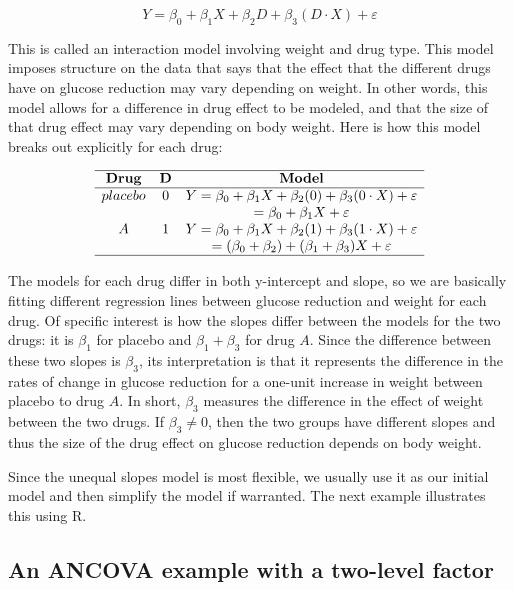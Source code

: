 \documentclass[
]{book}
\begin{document}
\[Y = \beta_0 + \beta_1 X + \beta_2 D + \beta_3(D\cdot X) + \varepsilon\]

This is called an interaction model involving weight and drug type. This model imposes structure on the data that says that the effect that the different drugs have on glucose reduction may vary depending on weight. In other words, this model allows for a difference in drug effect to be modeled, and that the size of that drug effect may vary depending on body weight. Here is how this model breaks out explicitly for each drug:

\[\begin{array}{ccc} 
\hline
\textbf{Drug} & \mathbf{D} & \textbf{Model} \\
\hline
placebo & 0 & Y = \beta_0 + \beta_1 X + \beta_2(0) + \beta_3(0\cdot X) + \varepsilon \\
& & = \beta_0 + \beta_1 X + \varepsilon \\
A       & 1 &   Y = \beta_0 + \beta_1 X + \beta_2(1) + \beta_3(1\cdot X) + \varepsilon \\
& & = (\beta_0 + \beta_2) + (\beta_1 + \beta_3) X + \varepsilon \\
\hline
\end{array}\]

The models for each drug differ in both y-intercept and slope, so we are basically fitting different regression lines between glucose reduction and weight for each drug. Of specific interest is how the slopes differ between the models for the two drugs: it is \(\beta_1\) for placebo and \(\beta_1 + \beta_3\) for drug \(A\). Since the difference between these two slopes is \(\beta_3\), its interpretation is that it represents the difference in the rates of change in glucose reduction for a one-unit increase in weight between placebo to drug \(A\). In short, \(\beta_3\) measures the difference in the effect of weight between the two drugs. If \(\beta_3 \neq 0\), then the two groups have different slopes and thus the size of the drug effect on glucose reduction depends on body weight.

Since the unequal slopes model is most flexible, we usually use it as our initial model and then simplify the model if warranted. The next example illustrates this using R.

\hypertarget{an-ancova-example-with-a-two-level-factor}{%
\subsection{An ANCOVA example with a two-level factor}\label{an-ancova-example-with-a-two-level-factor}}
\end{document}
